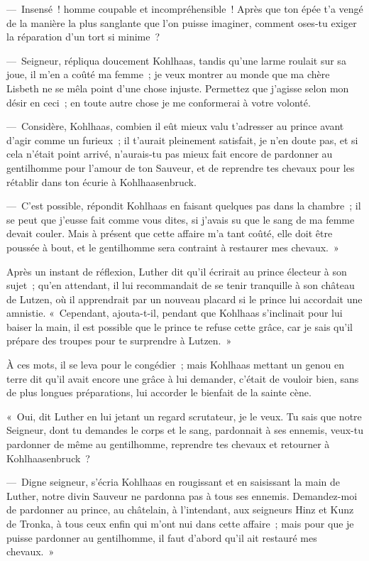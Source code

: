 \documentclass[french,twoside]{book} %
\begin{document}
— Insensé ! homme coupable et incompréhensible ! Après que ton épée t’a vengé de la manière la plus sanglante que l’on puisse imaginer, comment oses-tu exiger la réparation d’un tort si minime ?\par
— Seigneur, répliqua doucement Kohlhaas, tandis qu’une larme roulait sur sa joue, il m’en a coûté ma femme ; je veux montrer au monde que ma chère Lisbeth ne se mêla point d’une chose injuste. Permettez que j’agisse selon mon désir en ceci ; en toute autre chose je me conformerai à votre volonté.\par
— Considère, Kohlhaas, combien il eût mieux valu t’adresser au prince avant d’agir comme un furieux ; il t’aurait pleinement satisfait, je n’en doute pas, et si cela n’était point arrivé, n’aurais-tu pas mieux fait encore de pardonner au gentilhomme pour l’amour de ton Sauveur, et de reprendre tes chevaux pour les rétablir dans ton écurie à Kohlhaasenbruck.\par
— C’est possible, répondit Kohlhaas en faisant quelques pas dans la chambre ; il se peut que j’eusse fait comme vous dites, si j’avais su que le sang de ma femme devait couler. Mais à présent que cette affaire m’a tant coûté, elle doit être poussée à bout, et le gentilhomme sera contraint à restaurer mes chevaux. »\par
Après un instant de réflexion, Luther dit qu’il écrirait au prince électeur à son sujet ; qu’en attendant, il lui recommandait de se tenir tranquille à son château de Lutzen, où il apprendrait par un nouveau placard si le prince lui accordait une amnistie. « Cependant, ajouta-t-il, pendant que Kohlhaas s’inclinait pour lui baiser la main, il est possible que le prince te refuse cette grâce, car je sais qu’il prépare des troupes pour te surprendre à Lutzen. »\par
À ces mots, il se leva pour le congédier ; mais Kohlhaas mettant un genou en terre dit qu’il avait encore une grâce à lui demander, c’était de vouloir bien, sans de plus longues préparations, lui accorder le bienfait de la sainte cène.\par
« Oui, dit Luther en lui jetant un regard scrutateur, je le veux. Tu sais que notre Seigneur, dont tu demandes le corps et le sang, pardonnait à ses ennemis, veux-tu pardonner de même au gentilhomme, reprendre tes chevaux et retourner à Kohlhaasenbruck ?\par
— Digne seigneur, s’écria Kohlhaas en rougissant et en saisissant la main de Luther, notre divin Sauveur ne pardonna pas à tous ses ennemis. Demandez-moi de pardonner au prince, au châtelain, à l’intendant, aux seigneurs Hinz et Kunz de Tronka, à tous ceux enfin qui m’ont nui dans cette affaire ; mais pour que je puisse pardonner au gentilhomme, il faut d’abord qu’il ait restauré mes chevaux. »\par
\end{document}
